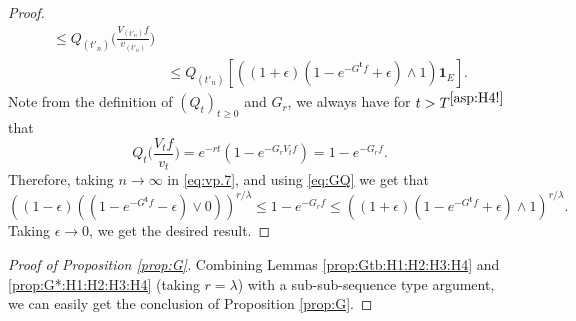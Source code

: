 \documentclass[12pt,a4paper]{amsart}
\numberwithin{equation}{section}
\theoremstyle{plain}
\theoremstyle{definition}
\theoremstyle{remark}
\begin{document}
\begin{proof}
\begin{align}
	\leq Q_{(t'_n)}\Big( \frac{V_{(t'_n)}f}{v_{(t'_n)}} \Big)
	\\&\leq Q_{(t'_n)}\left[ \left((1+\epsilon) ( 1 - e^{- G^{\mathbf t}f} + \epsilon) \wedge 1\right) \mathbf 1_E \right].
\end{align}
	Note from the definition of $(Q_t)_{t\geq 0}$ and $G_r$, we always have for $t>T^{\eqref{asp:H4!}}$ that
\[
	Q_t \Big( \frac{V_tf}{v_t}  \Big)
	= e^{- r t}( 1 - e^{- G_rV_tf}  )
	= 1- e^{- G_r f}.
\]
	Therefore, taking $n \to \infty$ in \eqref{eq:vp.7}, and using \eqref{eq:GQ}  we get that
\[
	\left((1-\epsilon) \left((1 - e^{- G^{\mathbf t}f} - \epsilon)\vee 0\right) \right)^{r/\lambda}
	\leq 1 - e^{- G_r f}
	 \leq \left((1 + \epsilon) (1 - e^{- G^{\mathbf t} f} + \epsilon)\wedge 1 \right)^{r/\lambda}.
\]
	Taking $\epsilon \to 0$, we get the desired result.
\end{proof}

\begin{proof}[Proof of Proposition \ref{prop:G}]
	Combining  Lemmas \ref{prop:Gtb:H1:H2:H3:H4} and \ref{prop:G*:H1:H2:H3:H4}
	(taking $r=\lambda$)
	with a sub-sub-sequence type argument, we can easily get the conclusion of Proposition \ref{prop:G}.
\end{proof}
\end{document}
